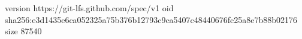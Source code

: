 version https://git-lfs.github.com/spec/v1
oid sha256:e3d1435e6ca052325a75b376b12793c9ca5407c48440676fc25a8e7b88b02176
size 87540
